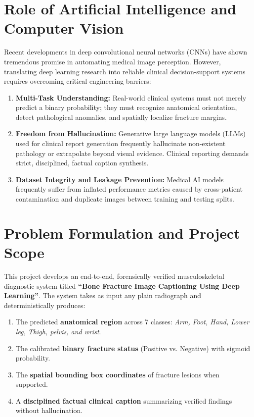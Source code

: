 \documentclass[12pt, a4paper]{report}
\begin{document}
\section{Role of Artificial Intelligence and Computer Vision}
Recent developments in deep convolutional neural networks (CNNs) have shown tremendous promise in automating medical image perception. However, translating deep learning research into reliable clinical decision-support systems requires overcoming critical engineering barriers:
\begin{enumerate}[leftmargin=*]
    \item \textbf{Multi-Task Understanding:} Real-world clinical systems must not merely predict a binary probability; they must recognize anatomical orientation, detect pathological anomalies, and spatially localize fracture margins.
    \item \textbf{Freedom from Hallucination:} Generative large language models (LLMs) used for clinical report generation frequently hallucinate non-existent pathology or extrapolate beyond visual evidence. Clinical reporting demands strict, disciplined, factual caption synthesis.
    \item \textbf{Dataset Integrity and Leakage Prevention:} Medical AI models frequently suffer from inflated performance metrics caused by cross-patient contamination and duplicate images between training and testing splits.
\end{enumerate}

\section{Problem Formulation and Project Scope}
This project develops an end-to-end, forensically verified musculoskeletal diagnostic system titled \textbf{``Bone Fracture Image Captioning Using Deep Learning''}. The system takes as input any plain radiograph and deterministically produces:
\begin{enumerate}
    \item The predicted \textbf{anatomical region} across 7 classes: \textit{Arm, Foot, Hand, Lower leg, Thigh, pelvis, and wrist}.
    \item The calibrated \textbf{binary fracture status} (Positive vs. Negative) with sigmoid probability.
    \item The \textbf{spatial bounding box coordinates} of fracture lesions when supported.
    \item A \textbf{disciplined factual clinical caption} summarizing verified findings without hallucination.
\end{enumerate}
\end{document}

